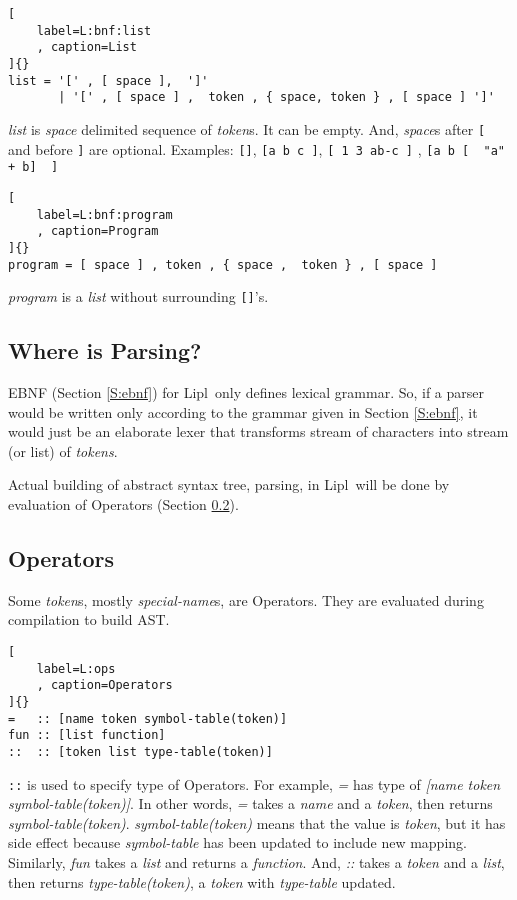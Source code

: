 \documentclass[12pt,letterpaper,notitlepage]{article}
\newcommand{\lipl}{Lipl}
\newcommand{\op}{Operator}
\begin{document}
\begin{lstlisting}[
    label=L:bnf:list
    , caption=List
]{}
list = '[' , [ space ],  ']'
       | '[' , [ space ] ,  token , { space, token } , [ space ] ']'
\end{lstlisting}
\emph{list} is \emph{space} delimited sequence of \emph{token}s.
It can be empty.
And, \emph{space}s after \verb![! and before \verb!]! are optional.
Examples: \verb![]!, \verb![a b c ]!, \verb![ 1 3 ab-c ]!
, \verb![a b [  "a" + b]  ]!

\begin{lstlisting}[
    label=L:bnf:program
    , caption=Program
]{}
program = [ space ] , token , { space ,  token } , [ space ]
\end{lstlisting}
\emph{program} is a \emph{list} without surrounding \verb![]!'s.

\subsection{Where is Parsing?}

EBNF (Section \ref{S:ebnf}) for \lipl\ only defines lexical grammar.
So, if a parser would be written only according to the grammar given in
Section \ref{S:ebnf}, it would just be an elaborate lexer that
transforms stream of characters into stream (or list) of \emph{tokens}.

Actual building of abstract syntax tree, parsing, in \lipl\
will be done by evaluation of \op s (Section \ref{S:ops}).

\subsection{\op s}
\label{S:ops}

Some \emph{token}s, mostly \emph{special-name}s, are \op s.
They are evaluated during compilation to build AST.

\begin{lstlisting}[
    label=L:ops
    , caption=Operators
]{}
=   :: [name token symbol-table(token)]
fun :: [list function]
::  :: [token list type-table(token)]
\end{lstlisting}
\verb!::! is used to specify type of \op s.
For example, \emph{=} has type of \emph{[name token symbol-table(token)]}.
In other words, \emph{=} takes a \emph{name} and a \emph{token},
then returns \emph{symbol-table(token)}.
\emph{symbol-table(token)} means that the value is \emph{token},
but it has side effect because \emph{symbol-table} has been updated to
include new mapping.
Similarly, \emph{fun} takes a \emph{list} and returns a \emph{function}.
And, \emph{::} takes a \emph{token} and a \emph{list},
then returns \emph{type-table(token)}, a \emph{token} with
\emph{type-table} updated.
\end{document}
